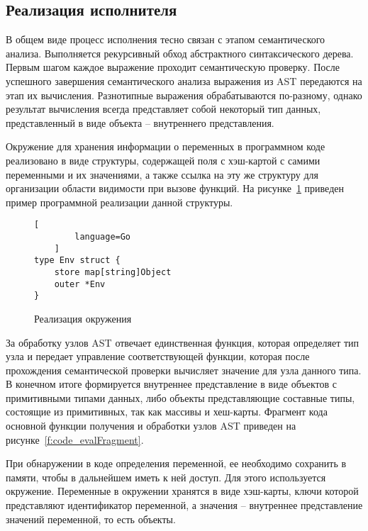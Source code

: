 \subsection{Реализация исполнителя}

В общем виде процесс исполнения тесно связан с этапом семантического анализа.
Выполняется рекурсивный обход абстрактного синтаксического дерева.
Первым шагом каждое выражение проходит семантическую проверку.
После успешного завершения семантического анализа выражения из AST передаются на этап их вычисления.
Разнотипные выражения обрабатываются по-разному, однако результат вычисления всегда представляет собой некоторый тип данных, представленный в виде объекта -- внутреннего представления.

Окружение для хранения информации о переменных в программном коде реализовано в виде структуры,
содержащей поля с хэш-картой с самими переменными и их значениями, а также ссылка на эту же структуру для организации области видимости при вызове функций.
На рисунке~\ref{f:code_envStruct} приведен пример программной реализации данной структуры.

\begin{figure}[ht]
	\centering
	\vspace{\toppaddingoffigure}
	\begin{lstlisting}[
        language=Go
    ]
type Env struct {
    store map[string]Object
    outer *Env
}
\end{lstlisting}
	\caption{Реализация окружения}
	\label{f:code_envStruct}
\end{figure}

За обработку узлов AST отвечает единственная функция, которая определяет тип узла и передает управление соответствующей функции,
которая после прохождения семантической проверки вычисляет значение для узла данного типа.
В конечном итоге формируется внутреннее представление в виде объектов с примитивными типами данных, либо объекты представляющие составные типы, состоящие из примитивных, так как массивы и хеш-карты.
Фрагмент кода основной функции получения и обработки узлов AST приведен на рисунке~\ref{f:code_evalFragment}.

При обнаружении в коде определения переменной, ее необходимо сохранить в памяти, чтобы в дальнейшем иметь к ней доступ.
Для этого используется окружение.
Переменные в окружении хранятся в виде хэш-карты, ключи которой представляют идентификатор переменной, а значения – внутреннее представление значений переменной, то есть объекты.

